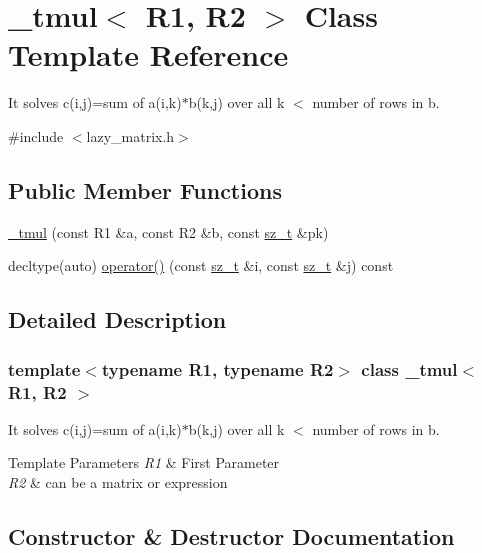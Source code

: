 \hypertarget{class__tmul}{}\section{\+\_\+tmul$<$ R1, R2 $>$ Class Template Reference}
\label{class__tmul}


It solves c(i,j)=sum of a(i,k)$\ast$b(k,j) over all k $<$ number of rows in b.  




{\ttfamily \#include $<$lazy\+\_\+matrix.\+h$>$}

\subsection*{Public Member Functions}
\begin{DoxyCompactItemize}
\item 
\mbox{\hyperlink{class__tmul_a95b4c7d2e3184b4ecc40bfac14529764}{\+\_\+tmul}} (const R1 \&a, const R2 \&b, const \mbox{\hyperlink{lazy__matrix_8h_acba2745dcfc55b2d05ff45adc6a0a015}{sz\+\_\+t}} \&pk)
\item 
decltype(auto) \mbox{\hyperlink{class__tmul_a1ea745e3d3569e49fe68d29ca9ad416b}{operator()}} (const \mbox{\hyperlink{lazy__matrix_8h_acba2745dcfc55b2d05ff45adc6a0a015}{sz\+\_\+t}} \&i, const \mbox{\hyperlink{lazy__matrix_8h_acba2745dcfc55b2d05ff45adc6a0a015}{sz\+\_\+t}} \&j) const
\end{DoxyCompactItemize}


\subsection{Detailed Description}
\subsubsection*{template$<$typename R1, typename R2$>$\newline
class \+\_\+tmul$<$ R1, R2 $>$}

It solves c(i,j)=sum of a(i,k)$\ast$b(k,j) over all k $<$ number of rows in b. 


\begin{DoxyTemplParams}{Template Parameters}
{\em R1} & First Parameter \\
\hline
{\em R2} & can be a matrix or expression \\
\hline
\end{DoxyTemplParams}


\subsection{Constructor \& Destructor Documentation}
\mbox{\label{class__tmul_a95b4c7d2e3184b4ecc40bfac14529764}} 
